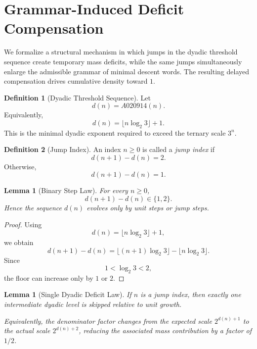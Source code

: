 \documentclass[12pt, oneside]{article}
\numberwithin{equation}{section}
\theoremstyle{definition}
\newtheorem{definition}{Definition}[section]
\theoremstyle{plain}
\newtheorem{lemma}[theorem]{Lemma}
\theoremstyle{remark}
\begin{document}
\section{Grammar-Induced Deficit Compensation}
\label{sec:grammar-compensation}

We formalize a structural mechanism in which jumps in the dyadic
threshold sequence create temporary mass deficits, while the same jumps
simultaneously enlarge the admissible grammar of minimal descent words.
The resulting delayed compensation drives cumulative density toward $1$.


\begin{definition}[Dyadic Threshold Sequence]
Let
\[
d(n)=A020914(n).
\]
Equivalently,
\[
d(n)=\lfloor n\log_2 3 \rfloor + 1.
\]
This is the minimal dyadic exponent required to exceed the ternary scale
$3^n$.
\end{definition}


\begin{definition}[Jump Index]
An index $n\ge0$ is called a \emph{jump index} if
\[
d(n+1)-d(n)=2.
\]
Otherwise,
\[
d(n+1)-d(n)=1.
\]
\end{definition}


\begin{lemma}[Binary Step Law]
\label{lem:binary-step}
For every $n\ge0$,
\[
d(n+1)-d(n)\in\{1,2\}.
\]
Hence the sequence $d(n)$ evolves only by unit steps or jump steps.
\end{lemma}

\begin{proof}
Using
\[
d(n)=\lfloor n\log_2 3\rfloor+1,
\]
we obtain
\[
d(n+1)-d(n)
=
\lfloor (n+1)\log_2 3\rfloor-\lfloor n\log_2 3\rfloor.
\]
Since
\[
1<\log_2 3<2,
\]
the floor can increase only by $1$ or $2$.
\end{proof}


\begin{lemma}[Single Dyadic Deficit Law]
\label{lem:deficit-law}
If $n$ is a jump index, then exactly one intermediate dyadic level is
skipped relative to unit growth.

Equivalently, the denominator factor changes from the expected scale
$2^{d(n)+1}$ to the actual scale $2^{d(n)+2}$, reducing the associated
mass contribution by a factor of $1/2$.
\end{lemma}
\end{document}
